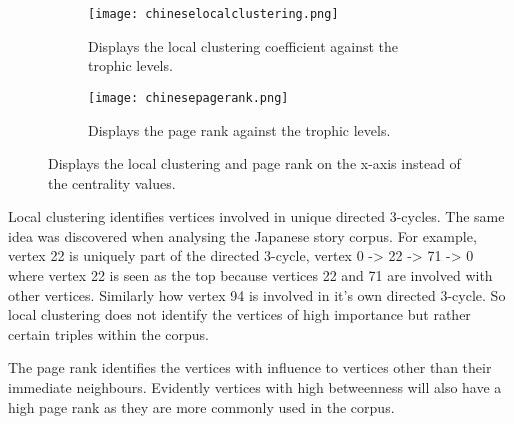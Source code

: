 \begin{figure}[H]
\centering
\begin{subfigure}{.45\textwidth}
	\hspace{-1cm} 
	\texttt{[image: chineselocalclustering.png]}
	\caption{Displays the local clustering coefficient against the trophic levels.}
	\label{fig:cnlc}
\end{subfigure}
\hfill
\begin{subfigure}{.45\textwidth}
	\hspace{-1cm} 
	\texttt{[image: chinesepagerank.png]}
	\caption{Displays the page rank against the trophic levels.}
	\label{fig:cnpr}
\end{subfigure}
\caption{Displays the local clustering and page rank on the x-axis instead of the centrality values.}
\label{fig:jpother}
\end{figure}

Local clustering identifies vertices involved in unique directed 3-cycles. The same idea was discovered when analysing the Japanese story corpus. For example, vertex 22 is uniquely part of the directed 3-cycle, vertex 0 -> 22 -> 71 -> 0 where vertex 22 is seen as the top because vertices 22 and 71 are involved with other vertices. Similarly how vertex 94 is involved in it's own directed 3-cycle. So local clustering does not identify the vertices of high importance but rather certain triples within the corpus. 

The page rank identifies the vertices with influence to vertices other than their immediate neighbours.  Evidently vertices with high betweenness will also have a high page rank as they are more commonly used in the corpus. 

